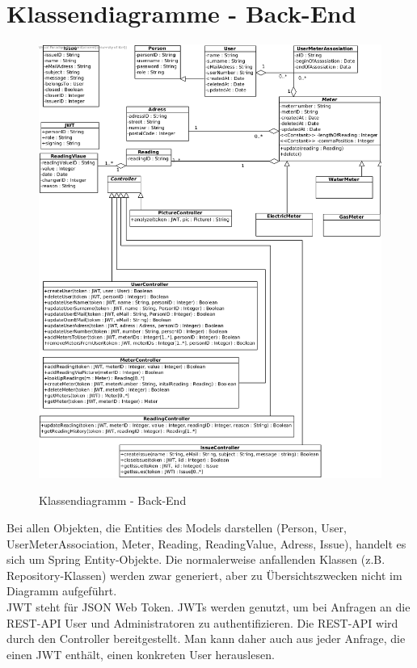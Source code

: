 \section{Klassendiagramme - Back-End}
\begin{figure}[H]
\includegraphics[width=15cm]{img/diagrams/backend-class-diagram}\\
\caption{Klassendiagramm - Back-End}
\end{figure}
Bei allen Objekten, die Entities des Models darstellen (Person, User, UserMeterAssociation, Meter, Reading, ReadingValue, Adress, Issue), handelt es sich um Spring Entity-Objekte.
Die normalerweise anfallenden Klassen (z.B. Repository-Klassen) werden zwar generiert, aber zu Übersichtszwecken nicht im Diagramm aufgeführt.\\
JWT steht für JSON Web Token. 
JWTs werden genutzt, um bei Anfragen an die REST-API User und Administratoren zu authentifizieren. Die REST-API wird durch den Controller bereitgestellt.
Man kann daher auch aus jeder Anfrage, die einen JWT enthält, einen konkreten User herauslesen. 
